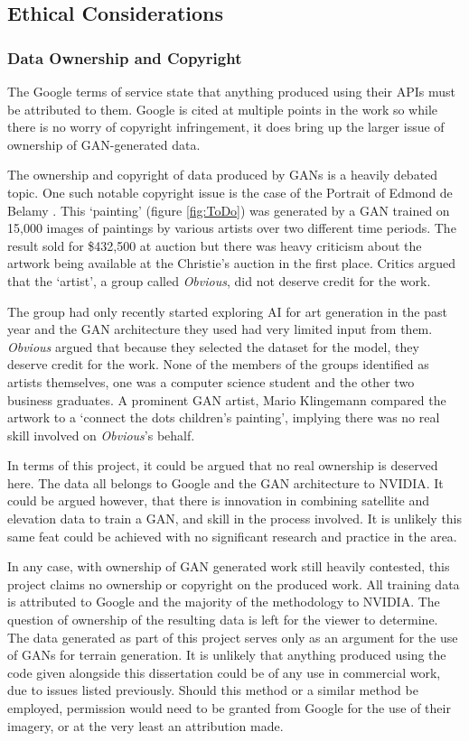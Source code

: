 \documentclass[a4paper]{report}
\begin{document}
\subsection{Ethical Considerations}
\subsubsection{Data Ownership and Copyright}
The Google terms of service state that anything produced using their APIs must be attributed to them. Google is cited at multiple points in the work so while there is no worry of copyright infringement, it does bring up the larger issue of ownership of GAN-generated data.

The ownership and copyright of data produced by GANs is a heavily debated topic. One such notable copyright issue is the case of the Portrait of Edmond de Belamy \cite{ToDo}. This `painting' (figure \ref{fig:ToDo}) was generated by a GAN trained on 15,000 images of paintings by various artists over two different time periods. The result sold for \$432,500 at auction but there was heavy criticism about the artwork being available at the Christie's auction in the first place. Critics argued that the `artist', a group called \textit{Obvious}, did not deserve credit for the work.

The group had only recently started exploring AI for art generation in the past year and the GAN architecture they used had very limited input from them. \textit{Obvious} argued that because they selected the dataset for the model, they deserve credit for the work. None of the members of the groups identified as artists themselves, one was a computer science student and the other two business graduates. A prominent GAN artist, Mario Klingemann compared the artwork to a  `connect the dots children's painting', implying there was no real skill involved on \textit{Obvious}'s behalf.

In terms of this project, it could be argued that no real ownership is deserved here. The data all belongs to Google and the GAN architecture to NVIDIA. It could be argued however, that there is innovation in combining satellite and elevation data to train a GAN, and skill in the process involved. It is unlikely this same feat could be achieved with no significant research and practice in the area.

In any case, with ownership of GAN generated work still heavily contested, this project claims no ownership or copyright on the produced work. All training data is attributed to Google and the majority of the methodology to NVIDIA. The question of ownership of the resulting data is left for the viewer to determine. The data generated as part of this project serves only as an argument for the use of GANs for terrain generation. It is unlikely that anything produced using the code given alongside this dissertation could be of any use in commercial work, due to issues listed previously. Should this method or a similar method be employed, permission would need to be granted from Google for the use of their imagery, or at the very least an attribution made.
\end{document}
